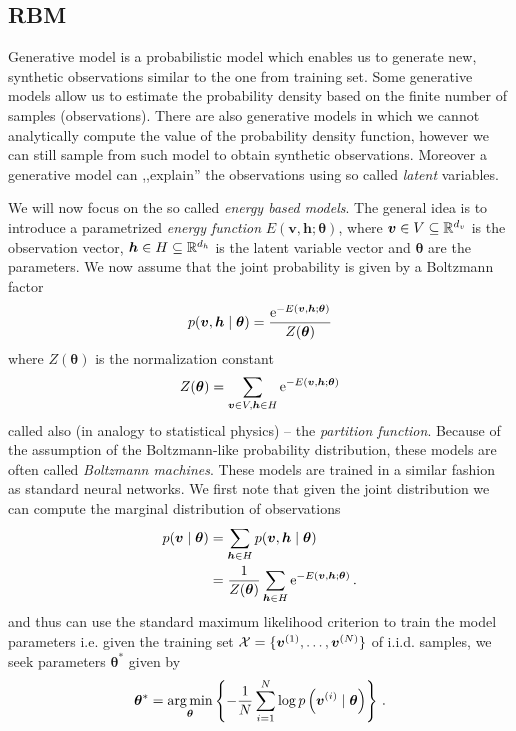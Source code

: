 \documentclass{myclass}
\begin{document}
\subsection{RBM}

Generative model is a probabilistic model which enables us to generate new, synthetic observations
similar to the one from training set. Some generative models allow us to estimate the probability
density based on the finite number of samples (observations). There are also generative models in
which we cannot analytically compute the value of the probability density function, however we can
still sample from such model to obtain synthetic observations. Moreover a generative model can
,,explain'' the observations using so called \emph{latent} variables.

We will now focus on the so called \emph{energy based models}. The general idea is to introduce a
parametrized \emph{energy function} \(E(\bm{v},\bm{h}; \bm{\theta})\), where \(\bm{v} \in V
\subseteq \mathbb{R}^{d_v}\) is the observation vector, \(\bm{h} \in H \subseteq \mathbb{R}^{d_h}\) is the
latent variable vector and \(\bm{\theta}\) are the parameters. We now assume that the joint
probability is given by a Boltzmann factor
\[
   p(\bm{v},\bm{h} \mid \bm{\theta}) = \frac{\mathrm{e}^{- E( \bm{v}, \bm{h}; \bm{\theta})}}{Z(\bm{\theta})}
\]
where \(Z(\bm{\theta})\) is the normalization constant
\[
   Z(\bm{\theta}) = \sum_{\bm{v} \in V, \bm{h} \in H} \mathrm{e}^{-E(\bm{v},\bm{h}; \bm{\theta})}
\]
called also (in analogy to statistical physics) -- the \emph{partition function}. Because of the
assumption of the Boltzmann-like probability distribution, these models are often called
\emph{Boltzmann machines}. These models are trained in a similar fashion as standard neural
networks. We first note that given the joint distribution we can compute the marginal distribution
of observations
\[
\begin{split}
   p(\bm{v} \mid \bm{\theta}) &= \sum_{\bm{h} \in H} p(\bm{v},\bm{h} \mid \bm{\theta}) \\
                              &= \frac{1}{Z(\bm{\theta})} \sum_{\bm{h} \in H} \mathrm{e}^{-E(\bm{v},\bm{h}; \bm{\theta})}\,.
\end{split}
\]
and thus can use the standard maximum likelihood criterion to train the model parameters i.e. given
the training set \(\mathcal{X} = \{\bm{v}^{(1)}, \ldots, \bm{v}^{(N)}\}\) of i.i.d. samples, we seek
parameters \(\bm{\theta}^*\) given by
\[
   \bm{\theta}^* = \operatorname*{arg\,min}_{\bm{\theta}} \left\{ -\frac{1}{N} \sum_{i=1}^N \log p\left(\bm{v}^{(i)} \mid \bm{\theta}\right) \right\}\,.
\]
\end{document}

